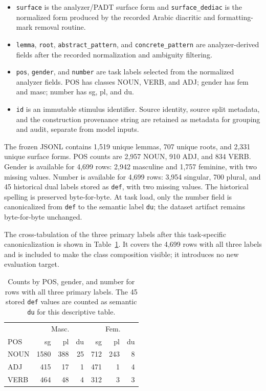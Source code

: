 \documentclass[pdflatex,sn-basic]{sn-jnl}
\begin{document}
\begin{itemize}
    \item \texttt{surface} is the analyzer/PADT surface form and
    \texttt{surface\_dediac} is the normalized form produced by the recorded
    Arabic diacritic and formatting-mark removal routine.
    \item \texttt{lemma}, \texttt{root}, \texttt{abstract\_pattern}, and
    \texttt{concrete\_pattern} are analyzer-derived fields after the recorded
    normalization and ambiguity filtering.
    \item \texttt{pos}, \texttt{gender}, and \texttt{number} are task labels
    selected from the normalized analyzer fields. POS has classes NOUN, VERB,
    and ADJ; gender has fem and masc; number has sg, pl, and du.
    \item \texttt{id} is an immutable stimulus identifier. Source identity,
    source split metadata, and the construction provenance string are retained
    as metadata for grouping and audit, separate from model inputs.
\end{itemize}

The frozen JSONL contains 1,519 unique lemmas, 707 unique roots, and 2,331
unique surface forms. POS counts are 2,957 NOUN, 910 ADJ, and 834 VERB.
Gender is available for 4,699 rows: 2,942 masculine and 1,757 feminine,
with two missing values. Number is available for 4,699 rows: 3,954 singular,
700 plural, and 45 historical dual labels stored as \texttt{def}, with two
missing values. The historical spelling is preserved byte-for-byte. At task
load, only the number field is canonicalized from \texttt{def} to the semantic
label \texttt{du}; the dataset artifact remains byte-for-byte unchanged.

The cross-tabulation of the three primary labels after this task-specific
canonicalization is shown in Table~\ref{tab:pos-gender-number}. It covers the
4,699 rows with all three labels and is included to make the class composition
visible; it introduces no new evaluation target.

\begin{table}[t]
\centering
\caption{Counts by POS, gender, and number for rows with all three primary
labels. The 45 stored \texttt{def} values are counted as semantic \texttt{du}
for this descriptive table.}
\label{tab:pos-gender-number}
\scriptsize
\begin{tabular}{lrrrrrr}
\toprule
 & \multicolumn{3}{c}{Masc.} & \multicolumn{3}{c}{Fem.} \\
POS & sg & pl & du & sg & pl & du \\
\midrule
NOUN & 1580 & 388 & 25 & 712 & 243 & 8 \\
ADJ  & 415 & 17 & 1 & 471 & 1 & 4 \\
VERB & 464 & 48 & 4 & 312 & 3 & 3 \\
\bottomrule
\end{tabular}
\end{table}
\end{document}
